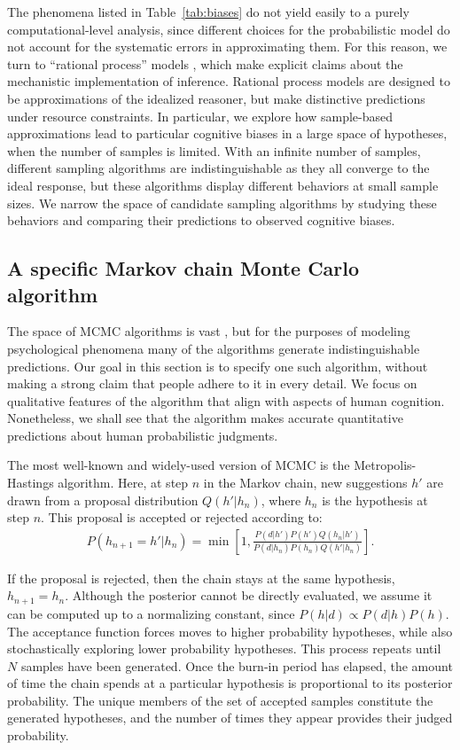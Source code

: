 The phenomena listed in Table~\ref{tab:biases} do not yield easily to a purely computational-level analysis, since different choices for the probabilistic model do not account for the systematic errors in approximating them. For this reason, we turn to ``rational process'' models \citep[see][for a review]{Griffiths2012BridgingCognition}, which make explicit claims about the mechanistic implementation of inference. Rational process models are designed to be approximations of the idealized reasoner, but make distinctive predictions under resource constraints. In particular, we explore how sample-based approximations lead to particular cognitive biases in a large space of hypotheses, when the number of samples is limited.
With an infinite number of samples, different sampling algorithms are indistinguishable as they all converge to the ideal response, but these algorithms display different behaviors at small sample sizes. We narrow the space of candidate sampling algorithms by studying these behaviors and comparing their predictions to observed cognitive biases.



\subsection{A specific Markov chain Monte Carlo algorithm}

The space of MCMC algorithms is vast \citep{robert13}, but for the purposes of modeling psychological phenomena many of the algorithms generate indistinguishable predictions. Our goal in this section is to specify one such algorithm, without making a strong claim that people adhere to it in every detail. We focus on qualitative features of the algorithm that align with aspects of human cognition. Nonetheless, we shall see that the algorithm makes accurate quantitative predictions about human probabilistic judgments.

The most well-known and widely-used version of MCMC is the Metropolis-Hastings algorithm. Here, at step $n$ in the Markov chain, new suggestions $h'$ are drawn from a proposal distribution $Q(h'|h_n)$, where $h_n$ is the hypothesis at step $n$. This proposal is accepted or rejected according to:
\begin{align}
P(h_{n+1}=h'|h_n) = \min\left[1, \frac{P(d|h')P(h') Q(h_n|h')}{P(d|h_n) P(h_n) Q(h'|h_n)} \right].
\end{align}

If the proposal is rejected, then the chain stays at the same hypothesis, $h_{n+1}=h_n$. Although the posterior cannot be directly evaluated, we assume it can be computed up to a normalizing constant, since $P(h|d) \propto P(d|h) P(h)$. The acceptance function forces moves to higher probability hypotheses, while also stochastically exploring lower probability hypotheses. This process repeats until $N$ samples have been generated. Once the burn-in period has elapsed, the amount of time the chain spends at a particular hypothesis is proportional to its posterior probability. The unique members of the set of accepted samples constitute the generated hypotheses, and the number of times they appear provides their judged probability.

